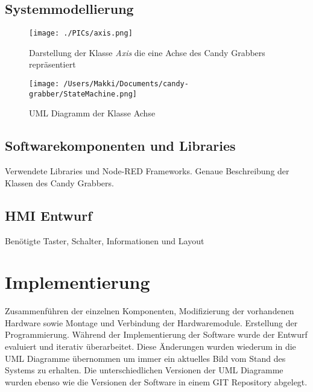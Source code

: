\documentclass[BMR,Bachelor,ngerman]{twbook}%
\begin{document}
\subsection{Systemmodellierung}
%
\begin{figure}[!htbp]
\texttt{[image: ./PICs/axis.png]}
\caption{Darstellung der Klasse \emph{Axis} die eine Achse des Candy Grabbers repräsentiert}\label{fig:uml_axis}
\end{figure}
%
\begin{figure}[!htbp]
\centering
\texttt{[image: /Users/Makki/Documents/candy-grabber/StateMachine.png]}
\caption{\ac{UML} Diagramm der Klasse Achse}\label{fig:uml_state}
\end{figure}
%
\subsection{Softwarekomponenten und Libraries}
Verwendete Libraries und Node-RED Frameworks. Genaue Beschreibung der Klassen des Candy Grabbers.
%
\subsection{HMI Entwurf}
Benötigte Taster, Schalter, Informationen und Layout
\section{Implementierung}
Zusammenführen der einzelnen Komponenten, Modifizierung der vorhandenen Hardware sowie Montage und Verbindung der Hardwaremodule. Erstellung der Programmierung. Während der Implementierung der Software wurde der Entwurf evaluiert und iterativ überarbeitet. Diese Änderungen wurden wiederum in die UML Diagramme übernommen um immer ein aktuelles Bild vom Stand des Systems zu erhalten. Die unterschiedlichen Versionen der UML Diagramme wurden ebenso wie die Versionen der Software in einem GIT Repository abgelegt.
%
\end{document}
